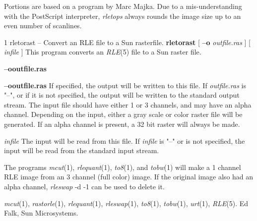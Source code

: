 Portions are based on a program by Marc Majka.
Due to a mis-understanding with the PostScript interpreter,
{\it rletops}
always rounds the image size up to an even number of scanlines.
\newpage


%
%
%
 1
rletorast -- Convert an RLE file to a Sun rasterfile.
{\bf rletorast}
[
{\bf --o} 
{\it outfile.ras}
] [ 
{\it infile}
]
This program converts an
{\it RLE}{\rm (5)}
file to a Sun raster file.
\begin{TPlist}{{\bf --o}{\it }{\bf outfile.ras}
}
\item[{{\bf --o}{\it }{\bf outfile.ras}
}]
If specified, the output will be written to this file.  If 
{\it outfile.ras}
is "--", or if it is not specified, the output will be written to the
standard output stream.  The input file should have either 1 or 3
channels, and may have an alpha channel.  Depending on the input,
either a gray scale or color raster file will be generated.  If an
alpha channel is present, a 32 bit raster will always be made.
\item[{{\it infile}}]
The input will be read from this file.  If
{\it infile}
is "--" or is not specified, the input will be read from the standard
input stream.

The programs
{\it mcut}{\rm (1),}
{\it rlequant}{\rm (1),}
{\it to8}{\rm (1),}
and
{\it tobw}{\rm (1)}
will make a 1 channel RLE image from an 3 channel (full color) image.
If the original image also had an alpha channel, 
{\it rleswap} -d -1
can be used to delete it.
\end{TPlist}
\raggedright
{\it mcut}{\rm (1),}
{\it rastorle}{\rm (1),}
{\it rlequant}{\rm (1),}
{\it rleswap}{\rm (1),}
{\it to8}{\rm (1),}
{\it tobw}{\rm (1),}
{\it urt}{\rm (1),}
{\it RLE}{\rm (5).}
Ed Falk, Sun Microsystems.
\newpage


